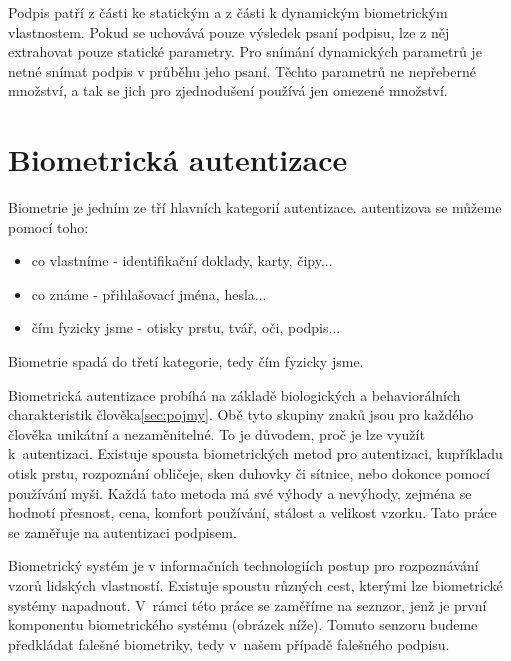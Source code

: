 
Podpis patří z části ke statickým a z části k dynamickým biometrickým vlastnostem.
Pokud se uchovává pouze výsledek psaní podpisu, lze z něj extrahovat pouze statické parametry.
Pro snímání dynamických parametrů je netné snímat podpis v průběhu jeho psaní.
Těchto parametrů ne nepřeberné množství, a tak se jich pro zjednodušení používá jen omezené množství.

\section{Biometrická autentizace}
Biometrie je jedním ze tří hlavních kategorií autentizace.
autentizova se můžeme pomocí toho:

\begin{itemize}
  \item{co vlastníme - identifikační doklady, karty, čipy...}   %
  \item{co známe - přihlašovací jména, hesla...}                %
  \item{čím fyzicky jsme - otisky prstu, tvář, oči, podpis...}  %
\end{itemize}                                                   %
Biometrie spadá do třetí kategorie, tedy čím fyzicky jsme. 

Biometrická autentizace probíhá na základě biologických a behaviorálních charakteristik člověka\ref{sec:pojmy}. 
Obě tyto skupiny znaků jsou pro každého člověka unikátní a nezaměnitelné. To je důvodem, proč je lze využít k~autentizaci.
Existuje spousta biometrických metod pro autentizaci, kupříkladu otisk prstu, rozpoznání obličeje, sken duhovky či sítnice, nebo dokonce pomocí používání myši. 
Každá tato metoda má své výhody a nevýhody, zejména se hodnotí přesnost, cena, komfort používání, stálost a velikost vzorku. %
Tato práce se zaměřuje na autentizaci podpisem.

Biometrický systém je v informačních technologiích postup pro rozpoznávání vzorů lidských vlastností.       %
Existuje spoustu různých cest, kterými lze biometrické systémy napadnout.                                   %
V~rámci této práce se zaměříme na seznzor, jenž je první komponentu biometrického systému (obrázek níže).   %
Tomuto senzoru budeme předkládat falešné biometriky, tedy v~našem případě falešného podpisu.                %

